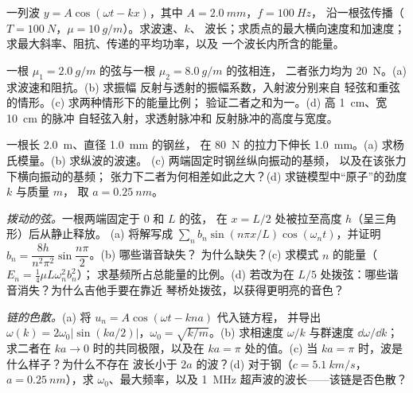\begin{exercise}[$\star\star$]\label{exo:b2:waves-on-strings:7}
一列波 $y = A\cos(\omega t - kx)$，其中 $A = \qty{2.0}{mm}$，$f = \qty{100}{Hz}$，
沿一根弦传播（$T = \qty{100}{N}$，$\mu = \qty{10}{g/m}$）。求波速、$k$、
波长；求质点的最大横向速度和加速度；
求最大斜率、阻抗、传递的平均功率，以及
一个波长内所含的能量。
\end{exercise}

\begin{exercise}[$\star\star$]\label{exo:b2:waves-on-strings:8}
一根 $\mu_1 = \qty{2.0}{g/m}$ 的弦与一根 $\mu_2 = \qty{8.0}{g/m}$ 的弦相连，
二者张力均为 \qty{20}{N}。(a) 求波速和阻抗。(b) 求振幅
反射与透射的振幅系数，入射波分别来自
轻弦和重弦的情形。(c) 求两种情形下的能量比例；
验证二者之和为一。(d) 高 \qty{1}{cm}、宽 \qty{10}{cm} 的脉冲
自轻弦入射，求透射脉冲和
反射脉冲的高度与宽度。
\end{exercise}

\begin{exercise}[$\star\star$]\label{exo:b2:waves-on-strings:9}
一根长 \qty{2.0}{m}、直径 \qty{1.0}{mm} 的钢丝，
在 \qty{80}{N} 的拉力下伸长 \qty{1.0}{mm}。(a) 求杨氏模量。(b) 求纵波的波速。
(c) 两端固定时钢丝纵向振动的基频，
以及在该张力下横向振动的基频；
张力下二者为何相差如此之大？(d) 求链模型中“原子”的劲度 $k$ 与质量 $m$，
取 $a = \qty{0.25}{nm}$。
\end{exercise}

\begin{exercise}[$\star\star\star$]\label{exo:b2:waves-on-strings:10}
\emph{拨动的弦。}一根两端固定于 $0$ 和 $L$ 的弦，
在 $x = L/2$ 处被拉至高度 $h$（呈三角形）后从静止释放。
(a) 将解写成 $\sum_nb_n\sin(n\pi x/L)\cos(\omega_nt)$，并证明
$b_n = \dfrac{8h}{n^2\pi^2}\sin\dfrac{n\pi}2$。(b) 哪些谐音缺失？
为什么缺失？(c) 求模式 $n$ 的能量（$E_n = \tfrac14\mu L\omega_n^2b_n^2$）；
求基频所占总能量的比例。(d) 若改为在
$L/5$ 处拨弦：哪些谐音消失？为什么吉他手要在靠近
琴桥处拨弦，以获得更明亮的音色？
\end{exercise}

\begin{exercise}[$\star\star\star$]\label{exo:b2:waves-on-strings:11}
\emph{链的色散。}(a) 将 $u_n = A\cos(\omega t - kna)$ 代入链方程，
并导出 $\omega(k) = 2\omega_0|\sin(ka/2)|$，$\omega_0 =
\sqrt{k/m}$。(b) 求相速度 $\omega/k$ 与群速度 $\dd\omega/\dd k$；
求二者在 $ka \to 0$ 时的共同极限，以及在 $ka = \pi$ 处的值。(c)
当 $ka = \pi$ 时，波是什么样子？为什么不存在
波长小于 $2a$ 的波？(d) 对于钢（$c = \qty{5.1}{km/s}$，$a =
\qty{0.25}{nm}$），求 $\omega_0$、最大频率，以及
\qty{1}{MHz} 超声波的波长——该链是否色散？
\end{exercise}

